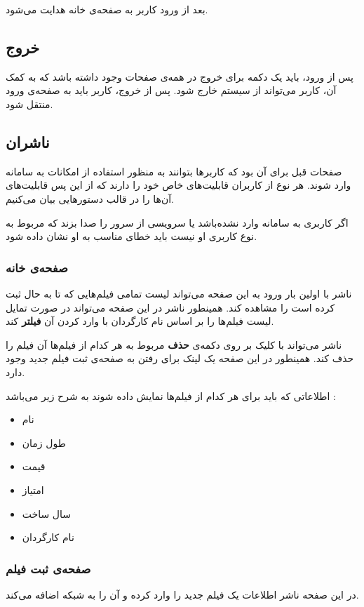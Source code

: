 \documentclass{utap}
\begin{document}
	بعد از ورود کاربر به صفحه‌ی خانه هدایت می‌شود.

	
	\subsection{خروج}
	پس از ورود، باید یک دکمه برای خروج در همه‌ی صفحات وجود داشته باشد که به کمک آن، کاربر می‌تواند از سیستم خارج شود. پس از خروج، کاربر باید به صفحه‌ی ورود منتقل شود.
	
	
	
	\subsection{ناشران}
	صفحات قبل برای آن بود که کاربر‌ها بتوانند به منظور استفاده از امکانات به سامانه‌ وارد شوند. هر نوع از کاربران قابلیت‌های خاص خود  را دارند که از این پس قابلیت‌های آن‌ها را در قالب دستورهایی بیان می‌کنیم.
	
		اگر کاربری به سامانه وارد نشده‌باشد یا سرویسی از سرور را صدا بزند که مربوط به نوع کاربری او نیست باید خطای مناسب به او نشان داده شود.
		
		\subsubsection{صفحه‌ی خانه} 
		ناشر با اولین بار ورود به این صفحه می‌تواند لیست تمامی فیلم‌هایی که تا به حال ثبت کرده است را مشاهده کند. همینطور ناشر در این صفحه می‌تواند در صورت تمایل لیست‌ فیلم‌ها را بر اساس نام کارگردان با وارد کردن آن \textbf{فیلتر} کند. 
		
		
		ناشر می‌تواند با کلیک بر روی دکمه‌ی \textbf{حذف} مربوط به هر کدام از فیلم‌ها آن فیلم را حذف کند. 
		همینطور در این صفحه یک لینک برای رفتن به صفحه‌ی ثبت فیلم جدید وجود دارد.
		
		اطلاعاتی که باید برای هر کدام از فیلم‌ها نمایش داده شوند به شرح زیر می‌باشد :‌
		\begin{itemize}
			\item نام 
			\item طول زمان  
			\item قیمت 
			\item امتیاز 
			\item سال ساخت
			\item نام کارگردان
		\end{itemize}
		
		 \subsubsection{صفحه‌ی ثبت فیلم}
	در این صفحه ناشر اطلاعات یک فیلم جدید را وارد کرده و آن را به شبکه اضافه می‌کند. 
	
\end{document}
